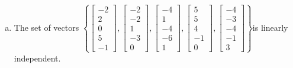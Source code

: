 \begin{exerciseAnswer}
\begin{enumerate}[(a)]
\item  The set of vectors \( \left\{ \left[\begin{array}{c}
-2 \\
2 \\
0 \\
5 \\
-1
\end{array}\right] , \left[\begin{array}{c}
-2 \\
-2 \\
1 \\
-3 \\
0
\end{array}\right] , \left[\begin{array}{c}
-4 \\
1 \\
-4 \\
-6 \\
1
\end{array}\right] , \left[\begin{array}{c}
5 \\
5 \\
4 \\
-1 \\
0
\end{array}\right] , \left[\begin{array}{c}
-4 \\
-3 \\
-4 \\
-1 \\
3
\end{array}\right] \right\} \)is linearly independent.
\end{enumerate}
    
\end{exerciseAnswer}
    

